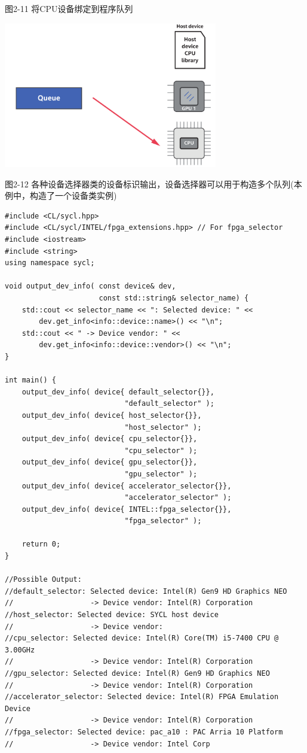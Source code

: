 \hspace*{\fill} \par %
图2-11 将CPU设备绑定到程序队列
\begin{center}
	\includegraphics[width=0.7\textwidth]{content/chapter-2/images/7}
\end{center}

\hspace*{\fill} \par %
图2-12 各种设备选择器类的设备标识输出，设备选择器可以用于构造多个队列(本例中，构造了一个设备类实例)
\begin{lstlisting}[caption={}]
#include <CL/sycl.hpp>
#include <CL/sycl/INTEL/fpga_extensions.hpp> // For fpga_selector
#include <iostream>
#include <string>
using namespace sycl;

void output_dev_info( const device& dev, 
					  const std::string& selector_name) {
	std::cout << selector_name << ": Selected device: " <<
		dev.get_info<info::device::name>() << "\n";
	std::cout << " -> Device vendor: " <<
		dev.get_info<info::device::vendor>() << "\n";
}

int main() {
	output_dev_info( device{ default_selector{}}, 
							"default_selector" );
	output_dev_info( device{ host_selector{}}, 
							"host_selector" );
	output_dev_info( device{ cpu_selector{}}, 
							"cpu_selector" );
	output_dev_info( device{ gpu_selector{}}, 
							"gpu_selector" );
	output_dev_info( device{ accelerator_selector{}},
							"accelerator_selector" );
	output_dev_info( device{ INTEL::fpga_selector{}}, 
							"fpga_selector" );
	
	return 0;
}

//Possible Output:
//default_selector: Selected device: Intel(R) Gen9 HD Graphics NEO
//					-> Device vendor: Intel(R) Corporation
//host_selector: Selected device: SYCL host device
//					-> Device vendor:
//cpu_selector: Selected device: Intel(R) Core(TM) i5-7400 CPU @ 3.00GHz
//					-> Device vendor: Intel(R) Corporation
//gpu_selector: Selected device: Intel(R) Gen9 HD Graphics NEO
//					-> Device vendor: Intel(R) Corporation
//accelerator_selector: Selected device: Intel(R) FPGA Emulation Device
//					-> Device vendor: Intel(R) Corporation
//fpga_selector: Selected device: pac_a10 : PAC Arria 10 Platform
//					-> Device vendor: Intel Corp
\end{lstlisting}


